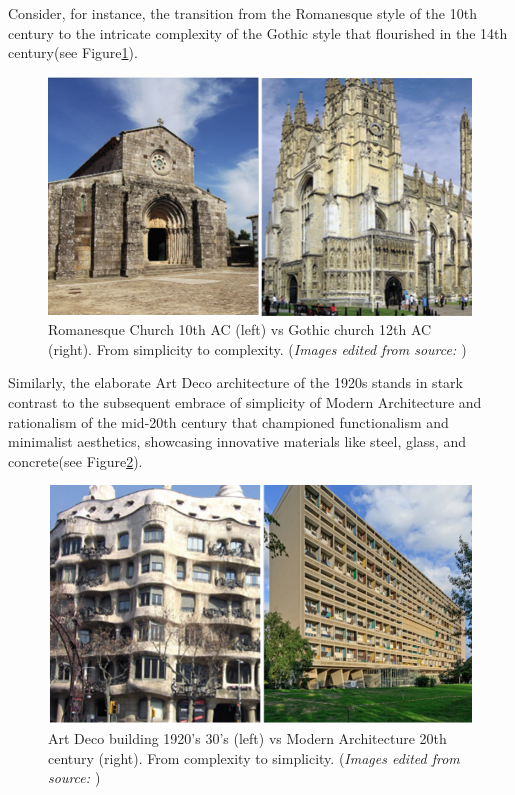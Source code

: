 Consider, for instance, the transition from the Romanesque style of the 10th century to the intricate complexity of the Gothic style that flourished in the 14th century\cite{Arora2023}(see Figure\ref{fig:RomanesquevsGothic}).
     \begin{figure}[htb]
          \centering
          \includegraphics[width= \linewidth]{Images/RomanesqueVsGothic}
          \caption{Romanesque Church 10th AC (left) vs Gothic church 12th AC (right). From simplicity to complexity. (\textit{Images edited from source: \cite{Stacbond2020}})}
          \label{fig:RomanesquevsGothic}
        \end{figure}
Similarly, the elaborate Art Deco architecture of the 1920s stands in stark contrast to the subsequent embrace of simplicity of Modern Architecture and rationalism  of the mid-20th century that championed functionalism and minimalist aesthetics, showcasing innovative materials like steel, glass, and concrete\cite{Stacbond2020}(see Figure\ref{fig:ArtDecovsModernism}).

     \begin{figure}[htb]
          \centering
          \includegraphics[width= \linewidth]{Images/ArtdecoVsModernism}
          \caption{Art Deco building 1920's 30's (left) vs Modern Architecture 20th century (right). From complexity to simplicity. (\textit{Images edited from source: \cite{Stacbond2020}}) }
          \label{fig:ArtDecovsModernism}
        \end{figure}

